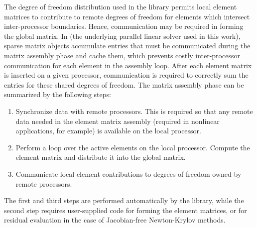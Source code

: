 The degree of freedom distribution used in the library permits local
element matrices to contribute to remote degrees of freedom for
elements which intersect inter-processor boundaries.  Hence, communication may be
required in forming the global matrix. In \PETSc{} (the underlying parallel linear solver used in this work), sparse matrix objects
accumulate entries that must be communicated during the matrix
assembly phase and cache them, which prevents costly inter-processor
communication for each element in the assembly loop.  After each
element matrix is inserted on a given processor, communication is
required to correctly sum the entries for these shared degrees of
freedom.  The matrix assembly phase can be summarized by the
following steps:
\begin{enumerate}
  \tightlist
  \item Synchronize data with remote processors.  This is required so
  that any remote data needed in the element matrix assembly (required in nonlinear applications, for example) is
  available on the local processor.
  \item Perform a loop over the active elements on the local
  processor.  Compute the element matrix and distribute it into the
  global matrix.
  \item Communicate local element contributions to degrees of freedom
  owned by remote processors.
\end{enumerate}
The first and third steps are performed automatically by the library,
while the second step requires user-supplied code for forming the
element matrices, or for residual evaluation in the case of
Jacobian-free Newton-Krylov methods.




